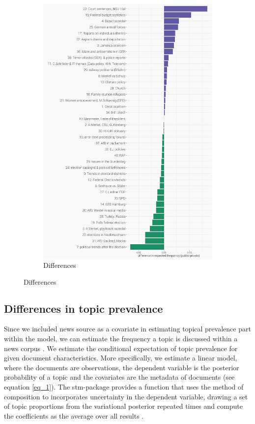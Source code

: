 \documentclass[12pt,a4paper,notitlepage]{article}
\begin{document}
\begin{figure}[H]
\begin{center}
	\begin{subfigure}[normla]{0.4\textwidth}
		\includegraphics[width=\textwidth,keepaspectratio]{../figs/topic_proportion_diff.png}
		\caption{Differences}
		\label{fig_topic_proportion_diff}
	\end{subfigure}
\end{center}
\end{figure}


\subsection{Differences in topic prevalence}
Since we included news source as a covariate in estimating topical prevalence part within the model, we can estimate the frequency a topic is discussed within a news corpus \citep{roberts_model_2016}. We estimate the conditional expectation of topic prevalence for given document characteristics. More specifically, we estimate a linear model, where the documents are observations, the dependent variable is the posterior probability of a topic and the covariates are the metadata of documents (see equation \ref{eq_1}). The stm-package provides a function that uses the method of composition to incorporates uncertainty in the dependent variable, drawing a set of topic proportions from the variational posterior repeated times and compute the coefficients as the average over all results \citep{roberts_stm:_2016}. 
\end{document}
